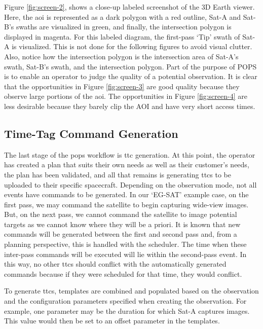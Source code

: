 Figure \ref{fig:screen-2}, shows a close-up labeled screenshot of the 3D Earth
viewer.  Here, the \gls{aoi} is represented as a dark polygon with a red
outline, Sat-A and Sat-B’s swaths are visualized in green, and finally, the
intersection polygon is displayed in magenta. For this labeled diagram, the
first-pass ‘Tip’ swath of Sat-A is visualized. This is not done for the
following figures to avoid visual clutter. Also, notice how the intersection
polygon is the intersection area of Sat-A’s swath, Sat-B’s swath, and the
intersection polygon. Part of the purpose of POPS is to enable an operator to
judge the quality of a potential observation. It is clear that the
opportunities in Figure \ref{fig:screen-3} are good quality because they
observe large portions of the \gls{aoi}. The opportunities in Figure
\ref{fig:screen-4} are less desirable because they barely clip the AOI and have
very short access times.


\subsection{Time-Tag Command Generation}

The last stage of the \gls{pops} workflow is \gls{ttc} generation.  At this
point, the operator has created a plan that suits their own needs as well as
their customer’s needs, the plan has been validated, and all that remains is
generating \glspl{ttc} to be uploaded to their specific spacecraft.  Depending
on the observation mode, not all events have commands to be generated. In our
‘EG-SAT’ example case, on the first pass, we may command the satellite to begin
capturing wide-view images. But, on the next pass, we cannot command the
satellite to image potential targets as we cannot know where they will be a
priori. It is known that new commands will be generated between the first and
second pass and, from a planning perspective, this is handled with the
scheduler. The time when these inter-pass commands will be executed will lie
within the second-pass event. In this way, no other \glspl{ttc} should conflict
with the automatically generated commands because if they were scheduled for
that time, they would conflict. 

To generate \glspl{ttc}, templates are combined and populated based on the
observation and the configuration parameters specified when creating the
observation. For example, one parameter may be the duration for which Sat-A
captures images. This value would then be set to an offset parameter in the
templates. 

